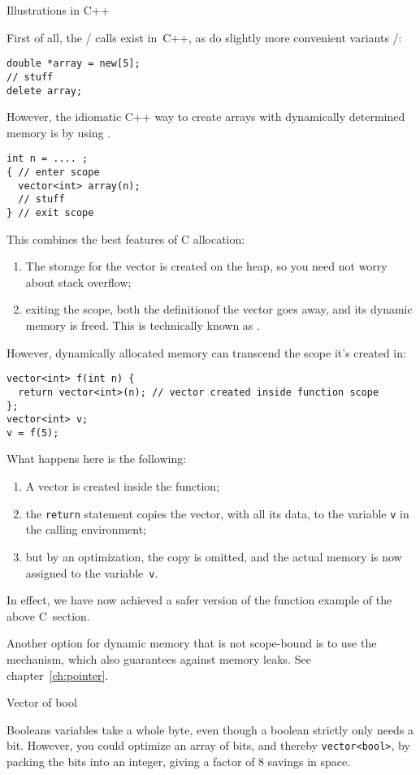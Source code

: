  {Illustrations in C++}

First of all, the / calls exist in~C++,
as do slightly more convenient variants /:
\begin{lstlisting}
double *array = new[5];
// stuff
delete array;
\end{lstlisting}

However, the idiomatic C++ way to create arrays with dynamically determined memory
is by using .
\begin{lstlisting}
int n = .... ;
{ // enter scope
  vector<int> array(n);
  // stuff
} // exit scope
\end{lstlisting}
This combines the best features of C allocation:
\begin{enumerate}
\item The storage for the vector is created on the heap,
  so you need not worry about stack overflow;
\item exiting the scope, both the definitionof the vector goes away,
  and its dynamic memory is freed.
  This is technically known as .
\end{enumerate}

However, dynamically allocated memory can transcend the scope
it's created in:
\begin{lstlisting}
vector<int> f(int n) {
  return vector<int>(n); // vector created inside function scope
};
vector<int> v;
v = f(5);
\end{lstlisting}
What happens here is the following:
\begin{enumerate}
\item A vector is created inside the function;
\item the \lstinline{return} statement copies the vector,
  with all its data, to the variable \lstinline{v}
  in the calling environment;
\item but by an optimization, the copy is omitted, and the actual
  memory is now assigned to the variable~\lstinline{v}.
\end{enumerate}
In effect, we have now achieved a safer version of the function example
of the above C~section.

Another option for dynamic memory that is not scope-bound
is to use the  mechanism,
which also guarantees against memory leaks. See chapter~\ref{ch:pointer}.

 {Vector of bool}

Booleans variables take a whole byte, even though
a boolean strictly only needs a bit.
However, you could optimize an array of bits,
and thereby \lstinline+vector<bool>+,
by packing the bits into an integer,
giving a factor of 8 savings in space.

